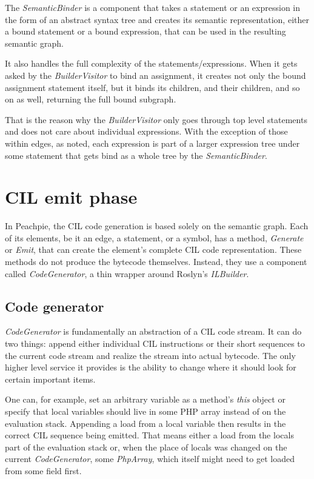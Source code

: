 The \emph{SemanticBinder} is a component that takes a statement or an expression in the form of an abstract syntax tree and creates its semantic representation, either a bound statement or a bound expression, that can be used in the resulting semantic graph. 

It also handles the full complexity of the statements/expressions. When it gets asked by the \emph{BuilderVisitor} to bind an assignment, it creates not only the bound assignment statement itself, but it binds its children, and their children, and so on as well, returning the full bound subgraph. 

That is the reason why the \emph{BuilderVisitor} only goes through top level statements and does not care about individual expressions. With the exception of those within edges, as noted, each expression is part of a larger expression tree under some statement that gets bind as a whole tree by the \emph{SemanticBinder}. 

\section{CIL emit phase}

In Peachpie, the CIL code generation is based solely on the semantic graph. Each of its elements, be it an edge, a statement, or a symbol, has a method, \emph{Generate} or \emph{Emit}, that can create the element’s complete CIL code representation. These methods do not produce the bytecode themselves. Instead, they use a component called \emph{CodeGenerator}, a thin wrapper around Roslyn’s \emph{ILBuilder}.


\subsection{Code generator}\label{CodeGen}
\emph{CodeGenerator} is fundamentally an abstraction of a CIL code stream. It can do two things: append either individual CIL instructions or their short sequences to the current code stream and realize the stream into actual bytecode. The only higher level service it provides is the ability to change where it should look for certain important items.

One can, for example, set an arbitrary variable as a method's \emph{this} object or specify that local variables should live in some PHP array instead of on the evaluation stack. Appending a load from a local variable then results in the correct CIL sequence being emitted. That means either a load from the locals part of the evaluation stack or, when the place of locals was changed on the current \emph{CodeGenerator}, some \emph{PhpArray}, which itself might need to get loaded from some field first. 

